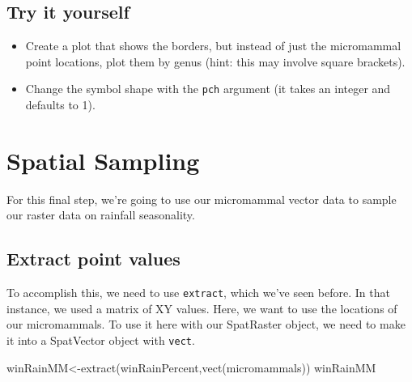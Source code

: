 \documentclass[
]{book}
\newenvironment{Shaded}{\begin{snugshade}}{\end{snugshade}}
\newcommand{\FunctionTok}[1]{\textcolor[rgb]{0.00,0.00,0.00}{#1}}
\newcommand{\NormalTok}[1]{#1}
\newcommand{\OtherTok}[1]{\textcolor[rgb]{0.56,0.35,0.01}{#1}}
\providecommand{\tightlist}{%
  \setlength{\itemsep}{0pt}\setlength{\parskip}{0pt}}
\begin{document}
\hypertarget{try-it-yourself-1}{%
\section{Try it yourself}\label{try-it-yourself-1}}

\begin{itemize}
\tightlist
\item
  Create a plot that shows the borders, but instead of just the micromammal point locations, plot them by genus (hint: this may involve square brackets).
\item
  Change the symbol shape with the \texttt{pch} argument (it takes an integer and defaults to 1).
\end{itemize}

\hypertarget{spatial-sampling}{%
\chapter{Spatial Sampling}\label{spatial-sampling}}

For this final step, we're going to use our micromammal vector data to sample our raster data on rainfall seasonality.

\hypertarget{extract-point-values}{%
\section{Extract point values}\label{extract-point-values}}

To accomplish this, we need to use \texttt{extract}, which we've seen before. In that instance, we used a matrix of XY values. Here, we want to use the locations of our micromammals. To use it here with our SpatRaster object, we need to make it into a SpatVector object with \texttt{vect}.

\begin{Shaded}
\begin{Highlighting}[]
\NormalTok{winRainMM}\OtherTok{\textless{}{-}}\FunctionTok{extract}\NormalTok{(winRainPercent,}\FunctionTok{vect}\NormalTok{(micromammals))}
\NormalTok{winRainMM}
\end{Highlighting}
\end{Shaded}
\end{document}
